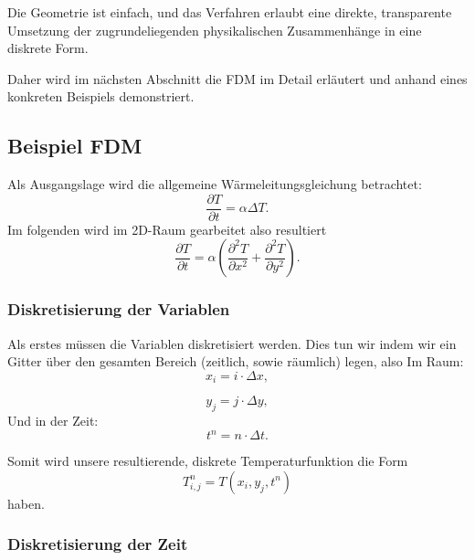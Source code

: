 Die Geometrie ist einfach, und das Verfahren erlaubt eine direkte, transparente Umsetzung der zugrundeliegenden physikalischen Zusammenhänge in eine diskrete Form.

Daher wird im nächsten Abschnitt die FDM im Detail erläutert und anhand eines konkreten Beispiels demonstriert.

\subsection{Beispiel FDM}

Als Ausgangslage wird die allgemeine Wärmeleitungsgleichung betrachtet:
\begin{equation}
	\frac{\partial T}{\partial t}
	=
	\alpha \Delta T.
	\label{parallelisierung:eq:Wärmeleitung_alg}
\end{equation}
Im folgenden wird im 2D-Raum gearbeitet also resultiert
\begin{equation}
	\frac{\partial T}{\partial t}
	=
	\alpha \left(
	\frac{\partial^2 T}{\partial x^2}
	+
	\frac{\partial^2 T}{\partial y^2}
	\right).
	\label{parallelisierung:eq:Wärmeleitung_2D}
\end{equation}


\subsubsection{Diskretisierung der Variablen}

Als erstes müssen die Variablen diskretisiert werden. Dies tun wir indem wir ein Gitter über den gesamten Bereich (zeitlich, sowie räumlich) legen, also
Im Raum:
\begin{equation}
	x_i
	=
	i \cdot \Delta x,
\end{equation}

\begin{equation}
	y_j
	=
	j \cdot \Delta y,
\end{equation}
Und in der Zeit:
\begin{equation}
	t^n
	=
	n \cdot \Delta t.
\end{equation}

Somit wird unsere resultierende, diskrete Temperaturfunktion die Form
\begin{equation}
	T^n_{i,j}
	=
	T(x_i,y_j,t^n)
\end{equation}
haben.


\subsubsection{Diskretisierung der Zeit}

